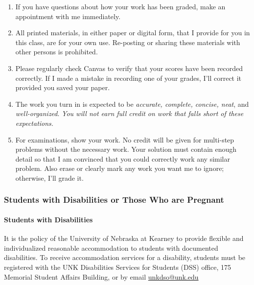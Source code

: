 \documentclass[12pt]{article}
\newcounter{ex}\setcounter{ex}{0}
\begin{document}
\begin{enumerate}
 
\item If you have questions about how your work has been graded, make an appointment with me immediately.

\item All printed materials, in either paper or digital form, that I 
provide for you in this class, are for your own use. Re-posting or 
sharing these materials with other persons is prohibited. 

\item Please regularly check Canvas  to verify that your scores have 
been recorded correctly.  If I made a mistake in recording one of
your grades, I'll correct it provided you saved your paper.

\item The work you turn in is expected to be \emph{accurate, 
complete, concise, neat}, and \emph{well-organized}.  
\emph{You will not earn full credit on work that falls short of 
these expectations.}

\item For examinations, show your work.  No credit will be given for multi-step problems without the necessary work. Your solution must contain enough detail
so that I am convinced that you could correctly work any similar problem. Also erase or clearly mark any work you want me to ignore; otherwise,
I'll grade it.  

\end{enumerate}

\subsubsection*{Students with Disabilities or Those Who are Pregnant}

\paragraph{Students with Disabilities} It is the policy of the University of Nebraska 
at Kearney to provide flexible and individualized reasonable 
accommodation to students with documented disabilities. To receive 
accommodation services for a disability, students must be
registered with the UNK Disabilities Services for Students (DSS) 
office, 175 Memorial Student Affairs Building, 
 or 
by email \href{mailto:unkdso@unk.edu}{unkdso@unk.edu}
\end{document}
